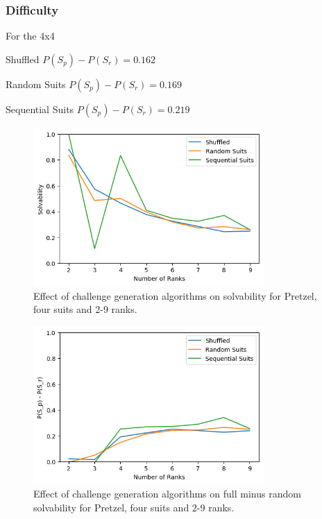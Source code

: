 \documentclass[journal]{IEEEtran}
\begin{document}
\subsubsection{Difficulty}
For the 4x4

Shuffled $P(S_p) - P(S_r) = 0.162$

Random Suits $P(S_p) - P(S_r) = 0.169$

Sequential Suits $P(S_p) - P(S_r) = 0.219$


\begin{figure}[t]
\includegraphics[width=8.8cm]{pretzelfulln.png}
\caption{Effect of challenge generation algorithms on solvability for Pretzel, four suits and 2-9 ranks.}
\label{fig:pretzelfullsolve}
\end{figure}

\begin{figure}[t]
\includegraphics[width=8.8cm]{pretzeldiffdist.png}
\caption{Effect of challenge generation algorithms on full minus random solvability for Pretzel, four suits and 2-9 ranks.}
\label{fig:pretzelfullsolve}
\end{figure}
\end{document}

